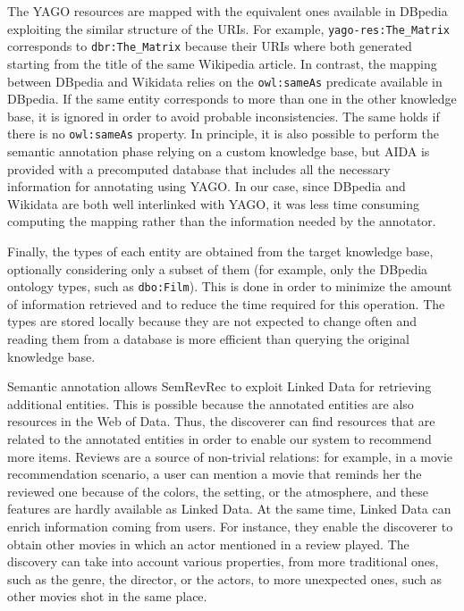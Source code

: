 The YAGO resources are mapped with the equivalent ones available in DBpedia exploiting the similar structure of the URIs. For example, \texttt{yago-res:The\_Matrix} corresponds to \texttt{dbr:The\_Matrix} because their URIs where both generated starting from the title of the same Wikipedia article. In contrast, the mapping between DBpedia and Wikidata relies on the \texttt{owl:sameAs} predicate available in DBpedia. If the same entity corresponds to more than one in the other knowledge base, it is ignored in order to avoid probable inconsistencies. The same holds if there is no \texttt{owl:sameAs} property. In principle, it is also possible to perform the semantic annotation phase relying on a custom knowledge base, but AIDA is provided with a precomputed database that includes all the necessary information for annotating using YAGO. In our case, since DBpedia and Wikidata are both well interlinked with YAGO, it was less time consuming computing the mapping rather than the information needed by the annotator.

Finally, the types of each entity are obtained from the target knowledge base, optionally considering only a subset of them (for example, only the DBpedia ontology types, such as \texttt{dbo:Film}). This is done in order to minimize the amount of information retrieved and to reduce the time required for this operation. The types are stored locally because they are not expected to change often and reading them from a database is more efficient than querying the original knowledge base.

Semantic annotation allows SemRevRec to exploit Linked Data for retrieving additional entities. This is possible because the annotated entities are also resources in the Web of Data. Thus, the discoverer can find resources that are related to the annotated entities in order to enable our system to recommend more items. Reviews are a source of non-trivial relations: for example, in a movie recommendation scenario, a user can mention a movie that reminds her the reviewed one because of the colors, the setting, or the atmosphere, and these features are hardly available as Linked Data. At the same time, Linked Data can enrich information coming from users. For instance, they enable the discoverer to obtain other movies in which an actor mentioned in a review played. The discovery can take into account various properties, from more traditional ones, such as the genre, the director, or the actors, to more unexpected ones, such as other movies shot in the same place.

